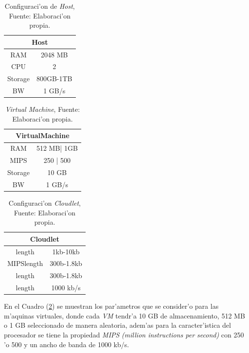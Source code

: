 \setcounter{table}{1}
\renewcommand\thetable{\arabic{table}}
\begin{table}[h!]
	\centering
	\begin{tabular}{@{}cc@{}}
		\toprule
		\multicolumn{2}{c}{{\bf Host}} \\ \midrule
		RAM           & 2048 MB        \\
		CPU           & 2              \\
		Storage       & 800GB-1TB      \\ \midrule
		BW            & 1 GB/s        
	\end{tabular}
	\caption{Configuraci'on de \textit{Host}, Fuente: Elaboraci'on propia.}
	\label{tab:host}
\end{table}

\newpage

\setcounter{table}{2}
\renewcommand\thetable{\arabic{table}}
\begin{table}[h!]
	\centering
	\begin{tabular}{@{}cc@{}}
		\toprule
		\multicolumn{2}{c}{{\bf VirtualMachine}} \\ \midrule
		RAM               & 512 MB| 1GB          \\
		MIPS              & 250 | 500            \\
		Storage           & 10 GB                \\ \midrule
		BW                & 1 GB/s              
	\end{tabular}
	\caption{\textit{Virtual Machine}, Fuente: Elaboraci'on propia.}
	\label{tab:machine}
\end{table}


\setcounter{table}{3}
\renewcommand\thetable{\arabic{table}}
\begin{table}[h!]
	\centering
	\begin{tabular}{@{}cc@{}}
		\toprule
		\multicolumn{2}{c}{{\bf Cloudlet}} \\ \midrule
		length           & 1kb-10kb        \\
		MIPSlength       & 300b-1.8kb      \\
		length           & 300b-1.8kb      \\ \midrule
		length           & 1000 kb/s      
	\end{tabular}
	\caption{Configuraci'on \textit{Cloudlet}, Fuente: Elaboraci'on propia.}
	\label{tab:cloudlet}
\end{table}


En el Cuadro (\ref{tab:machine}) se muestran los par'ametros que se consider'o para las m'aquinas virtuales, donde cada \textit{VM} tendr'a 10 GB de almacenamiento, 512 MB  o 1 GB seleccionado de manera aleatoria, adem'as para la caracter'istica del procesador se tiene  la propiedad \textit{MIPS} \textit{(million instructions per second)} con 250 'o 500 y un ancho de banda de 1000 kb/s.

